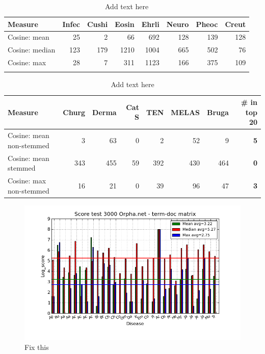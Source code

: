 \begin{table}[H]
  \begin{tiny}
  \caption{Add text here}
  \label{testResult}
  \begin{tabular}{|l|r|r|r|r|r|r|r|}
    \hline
    Measure &Infec&Cushi&Eosin&Ehrli&Neuro&Pheoc&Creut \\
    \hline
    Cosine: mean & 25 & 2 & 66 & 692 & 128 & 139 & 128 \\
    \hline
    Cosine: median & 123 & 179 & 1210 & 1004 & 665 & 502 & 76 \\
    \hline
    Cosine: max & 28 & 7 & 311 & 1123 & 166 & 375 & 109  \\
    \hline
  \multicolumn{8}{c}{} \\
  \end{tabular}
  \begin{tabular}{|l|r|r|r|r|r|r|r|}
    \hline
    Measure &Churg&Derma&Cat S&TEN&MELAS&Bruga& \scriptsize{\textbf{\# in top 20}} \\
    \hline
    Cosine: mean non-stemmed & 3 & 63 & 0 & 2 & 52 & 9 & \scriptsize{\textbf{5}} \\
    \hline
    Cosine: mean stemmed & 343 & 455 & 59 & 392 & 430 & 464 &  \scriptsize{\textbf{0}}\\
    \hline
    Cosine: max non-stemmed & 16 & 21 & 0 & 39 & 96 & 47 & \scriptsize{\textbf{3}} \\
    \hline
  \end{tabular}
  \end{tiny}
\end{table}

\begin{figure}[H]
        \begin{center}
          \includegraphics[width=1.0\textwidth]{barcharts/termDoc_orphan_hist_3000_ns_mea_med_max_nc.png}
        \end{center}
        \caption{Fix this}
        \label{termDoc_orphan_hist_3000_ns_mea_med_max_nc}
\end{figure}

